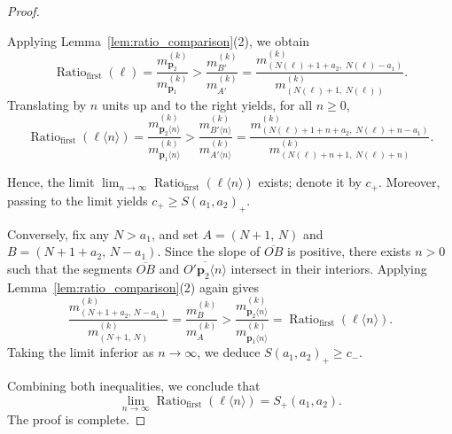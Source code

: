 \documentclass{article}
\theoremstyle{remark}
\begin{document}
\begin{proof}
\begin{center}
\end{center}

Applying Lemma~\ref{lem:ratio_comparison}(2), we obtain
\begin{equation*}
\operatorname{Ratio}_{\mathrm{first}}(\ell)
= \frac{m^{(k)}_{{\mathbf{p}}_2}}{m^{(k)}_{{\mathbf{p}}_1}}
> \frac{m^{(k)}_{B'}}{m^{(k)}_{A'}}
= \frac{m^{(k)}_{(N(\ell) +1 + a_2,\; N(\ell)-a_1)}}{m^{(k)}_{(N(\ell)+1,\; N(\ell))}}.
\end{equation*}
Translating by $n$ units up and to the right yields, for all $n \geq 0$,
\begin{equation*}
\operatorname{Ratio}_{\mathrm{first}}(\ell\langle n\rangle)
= \frac{m^{(k)}_{{\mathbf{p}}_2\langle n\rangle}}{m^{(k)}_{{\mathbf{p}}_1\langle n\rangle}}
> \frac{m^{(k)}_{B'\langle n\rangle}}{m^{(k)}_{A'\langle n\rangle}}
= \frac{m^{(k)}_{(N(\ell) +1+n + a_2,\; N(\ell)+n - a_1)}}{m^{(k)}_{(N(\ell)+n+1,\; N(\ell)+n)}}.
\end{equation*}

    Hence, the limit $\lim_{n \to \infty} \operatorname{Ratio}_{\mathrm{first}}(\ell\langle n\rangle)$ exists; denote it by $c_+$. 
    Moreover, passing to the limit yields $c_+ \geq S(a_1, a_2)_+$.

    Conversely, fix any $N > a_1$, and set $A = (N+1,\, N)$ and $B = (N+1+a_2,\, N-a_1)$. 
    Since the slope of $\overline{OB}$ is positive, there exists $n > 0$ such that the segments $\overline{OB}$ and $\overline{O'{\mathbf{p}}_2\langle n\rangle}$ intersect in their interiors. 
    Applying Lemma~\ref{lem:ratio_comparison}(2) again gives
    \begin{equation*}
        \frac{m^{(k)}_{(N+1+a_2,\, N-a_1)}}{m^{(k)}_{(N+1,\, N)}}
        = \frac{m^{(k)}_B}{m^{(k)}_A}
        > \frac{m^{(k)}_{{\mathbf{p}}_2\langle n\rangle}}{m^{(k)}_{{\mathbf{p}}_1\langle n\rangle}}
        = \operatorname{Ratio}_{\mathrm{first}}(\ell\langle n\rangle).
    \end{equation*}
    Taking the limit inferior as $n \to \infty$, we deduce $S(a_1, a_2)_+ \geq c_-$.

    Combining both inequalities, we conclude that
    \[
       \lim_{n\to \infty} \operatorname{Ratio}_{\mathrm{first}}(\ell\langle n\rangle)=S_+(a_1,a_2). 
    \]
    The proof is complete.
\end{proof}
\end{document}
